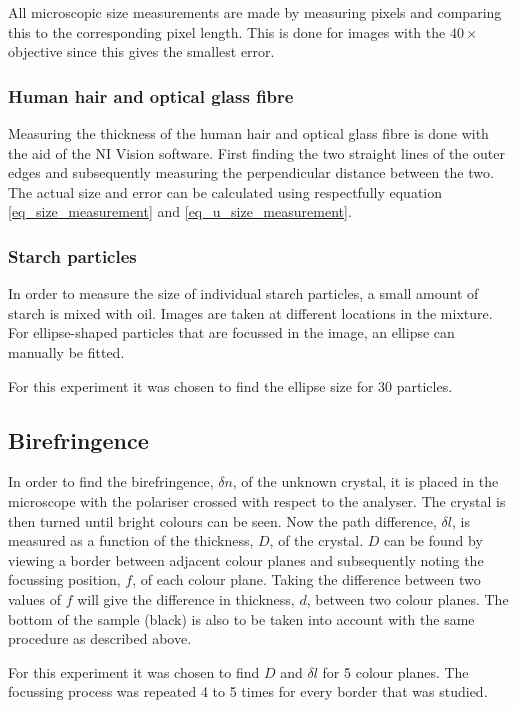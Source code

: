 All microscopic size measurements are made by measuring pixels and comparing this to the corresponding pixel length. This is done for images with the $40\times$ objective since this gives the smallest error.

\subsubsection{Human hair and optical glass fibre}

Measuring the thickness of the human hair and optical glass fibre is done with the aid of the NI Vision software. First finding the two straight lines of the outer edges and subsequently measuring the perpendicular distance between the two. The actual size and error can be calculated using respectfully equation \ref{eq_size_measurement} and \ref{eq_u_size_measurement}. 

\subsubsection{Starch particles}

In order to measure the size of individual starch particles, a small amount of starch is mixed with oil. Images are taken at different locations in the mixture. For ellipse-shaped particles that are focussed in the image, an ellipse can manually be fitted.

For this experiment it was chosen to find the ellipse size for 30 particles.


\subsection{Birefringence}

In order to find the birefringence, $\delta n$, of the unknown crystal, it is placed in the microscope with the polariser crossed with respect to the analyser. The crystal is then turned until bright colours can be seen. Now the path difference, $\delta l$, is measured as a function of the thickness, $D$, of the crystal. $D$ can be found by viewing a border between adjacent colour planes and subsequently noting the focussing position, $f$, of each colour plane. Taking the difference between two values of $f$ will give the difference in thickness, $d$, between two colour planes. The bottom of the sample (black) is also to be taken into account with the same procedure as described above. 

For this experiment it was chosen to find $D$ and $\delta l$ for 5 colour planes. The focussing process was repeated 4 to 5 times for every border that was studied.










